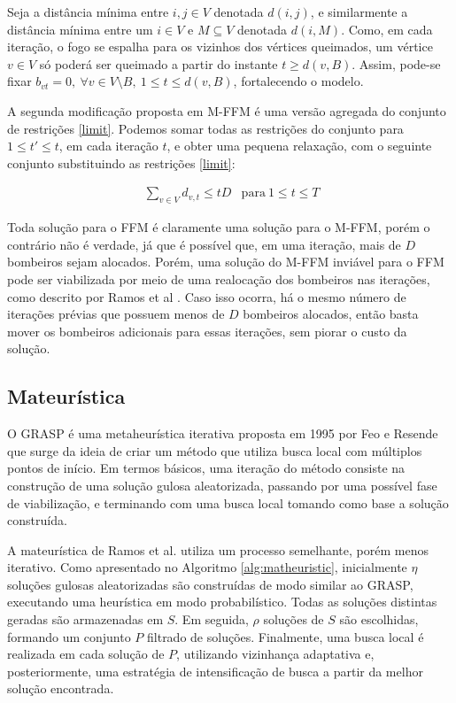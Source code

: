 \documentclass{MO824}
\begin{document}
    Seja a distância mínima entre $i,j \in V$ denotada $d(i,j)$, e similarmente a distância mínima entre um $i \in V$ e $M \subseteq V$ denotada $d(i,M)$. Como, em cada iteração, o fogo se espalha para os vizinhos dos vértices queimados, um vértice $v \in V$ só poderá ser queimado a partir do instante $t \geq d(v,B)$. Assim, pode-se fixar $b_{vt} = 0, \ \forall v \in V \setminus B, \ 1 \leq t \leq d(v,B)$, fortalecendo o modelo.
    
    A segunda modificação proposta em M-FFM é uma versão agregada do conjunto de restrições \eqref{limit}. Podemos somar todas as restrições do conjunto para $1 \leq t' \leq t$, em cada iteração $t$, e obter uma pequena relaxação, com o seguinte conjunto substituindo as restrições \eqref{limit}:
    \vspace{-16pt}
    \begin{center}
    \begin{align}
        & \ \sum_{v \in V}d_{v,t} \leq tD & \text{para} \ 1 \leq t \leq T & \label{new_limit}
    \end{align}
    \end{center}

    Toda solução para o FFM é claramente uma solução para o M-FFM, porém o contrário não é verdade, já que é possível que, em uma iteração, mais de $D$ bombeiros sejam alocados. Porém, uma solução do M-FFM inviável para o FFM pode ser viabilizada por meio de uma realocação dos bombeiros nas iterações, como descrito por Ramos et al \cite{natanael}. Caso isso ocorra, há o mesmo número de iterações prévias que possuem menos de $D$ bombeiros alocados, então basta mover os bombeiros adicionais para essas iterações, sem piorar o custo da solução.

\subsection{Mateurística} \label{math}
    O GRASP é uma metaheurística iterativa proposta em 1995 por Feo e Resende \cite{grasp} que surge da ideia de criar um método que utiliza busca local com múltiplos pontos de início. Em termos básicos, uma iteração do método consiste na construção de uma solução gulosa aleatorizada, passando por uma possível fase de viabilização, e terminando com uma busca local tomando como base a solução construída.
    
    A mateurística de Ramos et al. \cite{natanael} utiliza um processo semelhante, porém menos iterativo. Como apresentado no Algoritmo \ref{alg:matheuristic}, inicialmente $\eta$ soluções gulosas aleatorizadas são construídas de modo similar ao GRASP, executando uma heurística em modo probabilístico. Todas as soluções distintas geradas são armazenadas em $S$. Em seguida, $\rho$ soluções de $S$ são escolhidas, formando um conjunto $P$ filtrado de soluções. Finalmente, uma busca local é realizada em cada solução de $P$, utilizando vizinhança adaptativa e, posteriormente, uma estratégia de intensificação de busca a partir da melhor solução encontrada.
    
\end{document}

